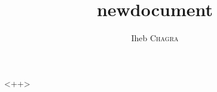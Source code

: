 \documentclass[french]{beamer}
\author{Iheb \textsc{Chagra}}
\title{newdocument}
\begin{document}
\frame{\titlepage}
<++>
\end{document}
